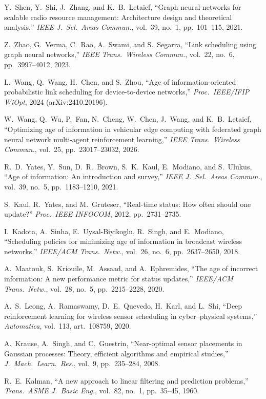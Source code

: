 {\begin{enumerate}[label={[\arabic*]},leftmargin=1cm,itemsep=0.15em]
  \item Y.~Shen, Y.~Shi, J.~Zhang, and K.~B.~Letaief, ``Graph neural networks for scalable radio resource management: Architecture design and theoretical analysis,'' \emph{IEEE J.\ Sel.\ Areas Commun.}, vol.~39, no.~1, pp.~101--115, 2021.
  \item Z.~Zhao, G.~Verma, C.~Rao, A.~Swami, and S.~Segarra, ``Link scheduling using graph neural networks,'' \emph{IEEE Trans.\ Wireless Commun.}, vol.~22, no.~6, pp.~3997--4012, 2023.
  \item L.~Wang, Q.~Wang, H.~Chen, and S.~Zhou, ``Age of information-oriented probabilistic link scheduling for device-to-device networks,'' \emph{Proc.\ IEEE/IFIP WiOpt}, 2024 (arXiv:2410.20196).
  \item W.~Wang, Q.~Wu, P.~Fan, N.~Cheng, W.~Chen, J.~Wang, and K.~B.~Letaief, ``Optimizing age of information in vehicular edge computing with federated graph neural network multi-agent reinforcement learning,'' \emph{IEEE Trans.\ Wireless Commun.}, vol.~25, pp.~23017--23032, 2026.
  \item R.~D.~Yates, Y.~Sun, D.~R.~Brown, S.~K.~Kaul, E.~Modiano, and S.~Ulukus, ``Age of information: An introduction and survey,'' \emph{IEEE J.\ Sel.\ Areas Commun.}, vol.~39, no.~5, pp.~1183--1210, 2021.
  \item S.~Kaul, R.~Yates, and M.~Gruteser, ``Real-time status: How often should one update?'' \emph{Proc.\ IEEE INFOCOM}, 2012, pp.~2731--2735.
  \item I.~Kadota, A.~Sinha, E.~Uysal-Biyikoglu, R.~Singh, and E.~Modiano, ``Scheduling policies for minimizing age of information in broadcast wireless networks,'' \emph{IEEE/ACM Trans.\ Netw.}, vol.~26, no.~6, pp.~2637--2650, 2018.
  \item A.~Maatouk, S.~Kriouile, M.~Assaad, and A.~Ephremides, ``The age of incorrect information: A new performance metric for status updates,'' \emph{IEEE/ACM Trans.\ Netw.}, vol.~28, no.~5, pp.~2215--2228, 2020.
  \item A.~S.~Leong, A.~Ramaswamy, D.~E.~Quevedo, H.~Karl, and L.~Shi, ``Deep reinforcement learning for wireless sensor scheduling in cyber--physical systems,'' \emph{Automatica}, vol.~113, art.~108759, 2020.
  \item A.~Krause, A.~Singh, and C.~Guestrin, ``Near-optimal sensor placements in Gaussian processes: Theory, efficient algorithms and empirical studies,'' \emph{J.\ Mach.\ Learn.\ Res.}, vol.~9, pp.~235--284, 2008.
  \item R.~E.~Kalman, ``A new approach to linear filtering and prediction problems,'' \emph{Trans.\ ASME J.\ Basic Eng.}, vol.~82, no.~1, pp.~35--45, 1960.

\end{enumerate}}
